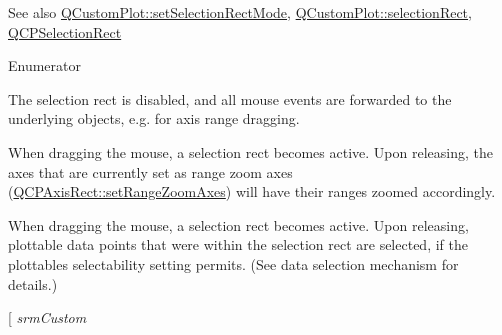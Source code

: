 \begin{DoxySeeAlso}{See also}
\hyperlink{class_q_custom_plot_a810ef958ebe84db661c7288b526c0deb}{Q\+Custom\+Plot\+::set\+Selection\+Rect\+Mode}, \hyperlink{class_q_custom_plot_ae64a3994735d8f592a60d9430526a163}{Q\+Custom\+Plot\+::selection\+Rect}, \hyperlink{class_q_c_p_selection_rect}{Q\+C\+P\+Selection\+Rect} 
\end{DoxySeeAlso}
\begin{Desc}
\item[Enumerator]\par
\begin{description}
\item[{\em 
srm\+None\hypertarget{namespace_q_c_p_ac9aa4d6d81ac76b094f9af9ad2d3aacfa894e973fdf7efc6174a9de50babb19fd}{}\label{namespace_q_c_p_ac9aa4d6d81ac76b094f9af9ad2d3aacfa894e973fdf7efc6174a9de50babb19fd}
}]The selection rect is disabled, and all mouse events are forwarded to the underlying objects, e.\+g. for axis range dragging. \item[{\em 
srm\+Zoom\hypertarget{namespace_q_c_p_ac9aa4d6d81ac76b094f9af9ad2d3aacfaaadea13ba6846072eb23d5f182be0fe3}{}\label{namespace_q_c_p_ac9aa4d6d81ac76b094f9af9ad2d3aacfaaadea13ba6846072eb23d5f182be0fe3}
}]When dragging the mouse, a selection rect becomes active. Upon releasing, the axes that are currently set as range zoom axes (\hyperlink{class_q_c_p_axis_rect_a9442cca2aa358405f39a64d51eca13d2}{Q\+C\+P\+Axis\+Rect\+::set\+Range\+Zoom\+Axes}) will have their ranges zoomed accordingly. \item[{\em 
srm\+Select\hypertarget{namespace_q_c_p_ac9aa4d6d81ac76b094f9af9ad2d3aacfa590be33019df7ba5276a8457a5c769c1}{}\label{namespace_q_c_p_ac9aa4d6d81ac76b094f9af9ad2d3aacfa590be33019df7ba5276a8457a5c769c1}
}]When dragging the mouse, a selection rect becomes active. Upon releasing, plottable data points that were within the selection rect are selected, if the plottable\textquotesingle{}s selectability setting permits. (See data selection mechanism for details.) \item[{\em 
srm\+Custom\hypertarget{namespace_q_c_p_ac9aa4d6d81ac76b094f9af9ad2d3aacfa88e34810ad5d2866d3857db386cbb442}{}\label{namespace_q_c_p_ac9aa4d6d81ac76b094f9af9ad2d3aacfa88e34810ad5d2866d3857db386cbb442}
}
\end{description}
\end{Desc}
